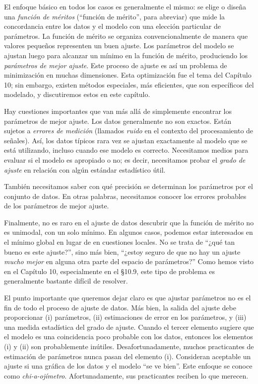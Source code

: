 \documentclass[10pt,a4paper]{book}
\begin{document}
El enfoque básico en todos los casos es generalmente el mismo: se elige o diseña una \textit{función de méritos} (“función de mérito”, para abreviar) que mide la concordancia entre los datos y el modelo con una elección particular de parámetros. La función de mérito se organiza convencionalmente de manera que valores pequeños representen un buen ajuste. Los parámetros del modelo se ajustan luego para alcanzar un mínimo en la función de mérito, produciendo los \textit{parámetros de mejor ajuste}. Este proceso de ajuste es así un problema de minimización en muchas dimensiones. Esta optimización fue el tema del Capítulo 10; sin embargo, existen métodos especiales, más eficientes, que son específicos del modelado, y discutiremos estos en este capítulo.

Hay cuestiones importantes que van más allá de simplemente encontrar los parámetros de mejor ajuste. Los datos generalmente no son exactos. Están sujetos a \textit{errores de medición} (llamados \textit{ruido} en el contexto del procesamiento de señales). Así, los datos típicos rara vez se ajustan exactamente al modelo que se está utilizando, incluso cuando ese modelo es correcto. Necesitamos medios para evaluar si el modelo es apropiado o no; es decir, necesitamos probar el \textit{grado de ajuste} en relación con algún estándar estadístico útil.

También necesitamos saber con qué precisión se determinan los parámetros por el conjunto de datos. En otras palabras, necesitamos conocer los errores probables de los parámetros de mejor ajuste.

Finalmente, no es raro en el ajuste de datos descubrir que la función de mérito no es unimodal, con un solo mínimo. En algunos casos, podemos estar interesados en el mínimo global en lugar de en cuestiones locales. No se trata de “¿qué tan bueno es este ajuste?”, sino más bien, “¿estoy seguro de que no hay un ajuste \textit{mucho mejor} en alguna otra parte del espacio de parámetros?” Como hemos visto en el Capítulo 10, especialmente en el §10.9, este tipo de problema es generalmente bastante difícil de resolver.

El punto importante que queremos dejar claro es que ajustar parámetros no es el fin de todo el proceso de ajuste de datos. Más bien, la salida del ajuste debe proporcionar (i) parámetros, (ii) estimaciones de error en los parámetros, y (iii) una medida estadística del grado de ajuste. Cuando el tercer elemento sugiere que el modelo es una coincidencia poco probable con los datos, entonces los elementos (i) y (ii) son probablemente inútiles. Desafortunadamente, muchos practicantes de estimación de parámetros nunca pasan del elemento (i). Consideran aceptable un ajuste si una gráfica de los datos y el modelo “se ve bien”. Este enfoque se conoce como \textit{chi-a-ojímetro}. Afortunadamente, sus practicantes reciben lo que merecen.
\end{document}
